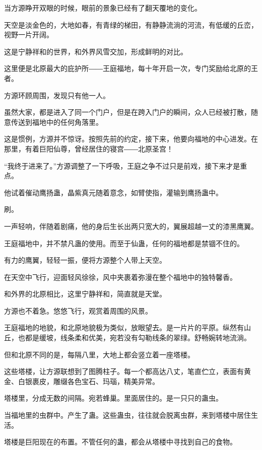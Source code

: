 
\begin{this_body}

当方源睁开双眼的时候，眼前的景象已经有了翻天覆地的变化。

天空是淡金色的，大地如春，有青绿的梯田，有静静流淌的河流，有低缓的丘峦，视野一片开阔。

这是宁静祥和的世界，和外界风雪交加，形成鲜明的对比。

这里便是北原最大的庇护所――王庭福地，每十年开启一次，专门奖励给北原的王者。

方源环顾周围，发现只有他一人。

虽然大家，都是进入了同一个门户，但是在跨入门户的瞬间，众人已经被打散，随意传送到福地中的任何角落里。

这是惯例，方源并不惊讶。按照先前的约定，接下来，他要向福地的中心进发。在那里，有着巨阳仙尊，曾经居住的寝宫――北原圣宫！

“我终于进来了。”方源调整了一下呼吸，王庭之争不过只是前戏，接下来才是重点。

他试着催动鹰扬蛊，晶紫真元随着意念，如臂使指，灌输到鹰扬蛊中。

刷。

一声轻响，伴随着剧痛，他的身后生长出两只宽大的，翼展超越一丈的漆黑鹰翼。

王庭福地中，并不禁凡蛊的使用。而至于仙蛊，任何的福地都是禁锢不住的。

有力的鹰翼，轻轻一振，便将方源整个人带上天空。

在天空中飞行，迎面轻风徐徐，风中夹裹着弥漫在整个福地中的独特馨香。

和外界的北原相比，这里宁静祥和，简直就是天堂。

方源也不着急。悠悠飞行，观赏着周围的风景。

王庭福地的地貌，和北原地貌极为类似，放眼望去。是一片片的平原。纵然有山丘，也都是缓坡，线条柔和优美，宛若没有勾勒线条的翠绿。舒畅婉转地流淌。

但和北原不同的是，每隔八里，大地上都会竖立着一座塔楼。

这些塔楼，让方源联想到了图腾柱子。每一个都高达八丈，笔直伫立，表面有黄金、白银裹皮，雕缀各色宝石、玛瑙，精美异常。

塔楼里，分成无数的间隔。宛若蜂巢。里面居住的。是一只只的蛊虫。

当福地里的虫群中。产生了蛊。这些蛊虫，往往就会脱离虫群，来到塔楼中居住生活。

塔楼是巨阳现在的布置。不管任何的蛊，都会从塔楼中寻找到自己的食物。


\end{this_body}
